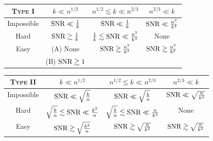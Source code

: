 \begin{figure*}
\begin{center}
\begin{tabular}{|c | c c c|}
\hline
\textsc{Type I} & $k \ll n^{1/2}$ & $n^{1/2} \lesssim k \ll n^{2/3}$ & $n^{2/3} \ll k$ \\
\hline
\textnormal{Impossible} & $\textnormal{SNR} \ll \frac{1}{k}$ & $\textnormal{SNR} \ll \frac{1}{k}$ & $\textnormal{SNR} \ll \frac{n^2}{k^4}$ \\
\textnormal{Hard} & $\textnormal{SNR} \gtrsim \frac{1}{k}$ & $\frac{1}{k} \lesssim \textnormal{SNR} \ll \frac{n^2}{k^4}$ & \textnormal{None} \\
\textnormal{Easy} & (A) \textnormal{None} & $\textnormal{SNR} \gtrsim \frac{n^2}{k^4}$ & $\textnormal{SNR} \gtrsim \frac{n^2}{k^4}$ \\
& (B) $\textnormal{SNR} \gtrsim 1$ & & \\
\hline
\end{tabular}
\vspace{5mm}

\begin{tabular}{|c | c c c|}
\hline
\textsc{Type II} & $k \ll n^{1/2}$ & $n^{1/2} \lesssim k \ll n^{2/3}$ & $n^{2/3} \ll k$ \\
\hline
\textnormal{Impossible} & $\textnormal{SNR} \ll \sqrt{\frac{k}{n}}$ & $\textnormal{SNR} \ll \sqrt{\frac{k}{n}}$ & $\textnormal{SNR} \ll \sqrt{\frac{n}{k^2}}$ \\
\textnormal{Hard} & $\sqrt{\frac{k}{n}} \lesssim \textnormal{SNR} \ll \frac{k^2}{n}$ & $\sqrt{\frac{k}{n}} \lesssim \textnormal{SNR} \ll \frac{n}{k^2}$ & \textnormal{None} \\
\textnormal{Easy} & $\textnormal{SNR} \gtrsim \sqrt{\frac{k^2}{n}}$ & $\textnormal{SNR} \gtrsim \sqrt{\frac{n}{k^2}}$ & $\textnormal{SNR} \gtrsim \sqrt{\frac{n}{k^2}}$ \\
\hline
\end{tabular}
\vspace{5mm}


\end{center}
\end{figure*}
